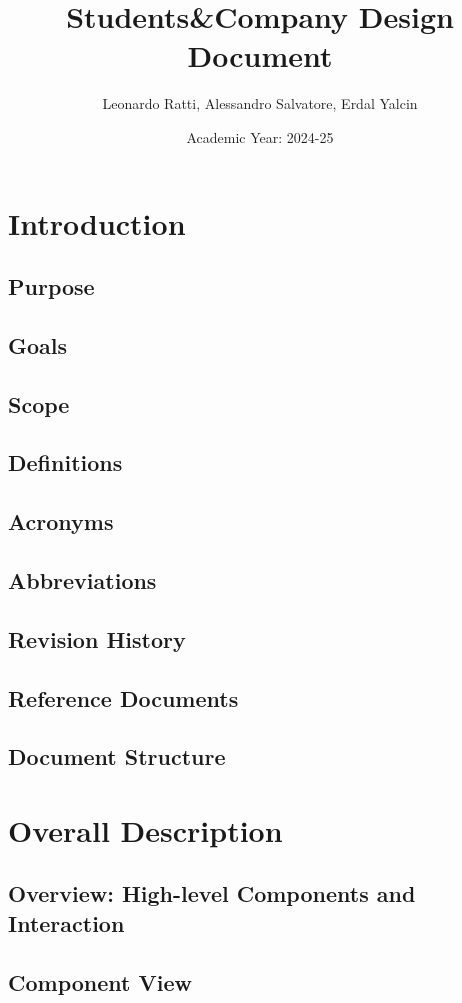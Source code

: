 \documentclass[a4paper,12pt]{article}
\title{Students\&Company Design Document}
\author{Leonardo Ratti, Alessandro Salvatore, Erdal Yalcin}
\date{Academic Year: 2024-25}
\begin{document}
\maketitle

\tableofcontents
\newpage

\section{Introduction}
\subsection{Purpose}
\subsection{Goals}
\subsection{Scope}
\subsection{Definitions}
\subsection{Acronyms}
\subsection{Abbreviations}
\subsection{Revision History}
\subsection{Reference Documents}
\subsection{Document Structure}

\section{Overall Description}
\subsection{Overview: High-level Components and Interaction}
\subsection{Component View}
\end{document}

